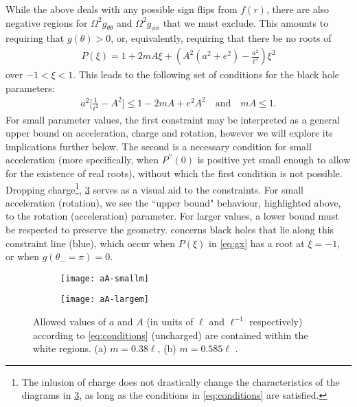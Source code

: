 \documentclass[
twoside,openright,frontopenright]{dmathesis}
\begin{document}
While the above deals with any possible sign flips from $f(r)$, there are also
negative regions for $\Omega^2 g_{\theta\theta}$ and $\Omega^2 g_{\phi\phi}$
that we must exclude. This amounts to requiring that $g(\theta)>0$, or,
equivalently, requiring that there be no roots of
\begin{align}\label{eq:gx}
P(\xi) = 1+ 2mA\xi+\left(A^2(a^2+e^2)-\frac{a^2}{\ell^2}\right)\xi^2
\end{align}
over $-1<\xi<1$. This leads to the following set of conditions for the black
hole parameters: 
\begin{align}\label{eq:conditions}
a^2\bigg[\frac{1}{\ell^2}-A^2\bigg] \leqslant 1-2mA+e^2A^2 \quad \mbox{and}
  \quad mA\leqslant 1. 
\end{align}
For small parameter values, the first constraint may be interpreted as a general
upper bound on acceleration, charge and rotation, however we will explore its
implications further below. The second is a necessary condition for small
acceleration (more specifically, when $P^{\prime\prime}(0)$ is positive yet
small enough to allow for the existence of real roots), without which the first
condition is not possible. Dropping charge\footnote{ The inlusion of charge
  does not drastically change the characteristics of the diagrams in
  \cref{fig:aA}, as long as the conditions in \cref{eq:conditions} are
  satisfied.}, \cref{fig:aA} serves as a visual aid to the constraints. For
small acceleration (rotation), we see the ``upper bound" behaviour, highlighted
above, to the rotation (acceleration) parameter. For larger values, a lower
bound must be respected to preserve the geometry.  concerns
black holes that lie along this constraint line (blue), which occur when
$P(\xi)$ in \cref{eq:gx} has a root at $\xi = -1$, or when $g(\theta_- =\pi)=0$.

\begin{figure}
\centering
\begin{subfigure}[b]{0.45\textwidth}
\texttt{[image: aA-smallm]}
\caption{\label{fig:aA-smallm}}
\end{subfigure}\quad
\begin{subfigure}[b]{0.45\textwidth}
\texttt{[image: aA-largem]}
\caption{\label{fig:aA-largem}}
\end{subfigure}%
\caption{\label{fig:aA}Allowed values of $a$ and $A$ (in units of $\ell$ and
  $\ell^{-1}$ respectively) according to \cref{eq:conditions} (uncharged) are
  contained within the white regions. (a) $m=0.38\ell$, (b) $m=0.585\ell$ %
  . %
}
\end{figure}
\end{document}
